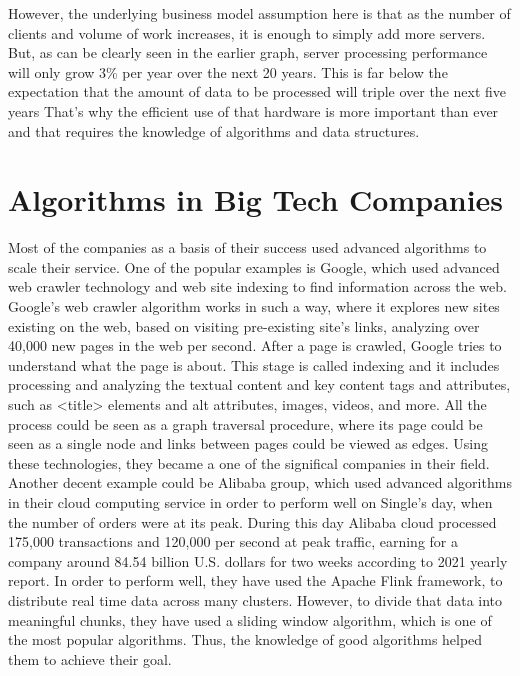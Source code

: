 However, the underlying business model assumption here is that as the number of clients and volume of work increases, it is enough to simply add more servers. But, as can be clearly seen in the earlier graph, server processing performance will only grow 3\% per year over the next 20 years. This is far below the expectation that the amount of data to be processed will triple over the next five years
That's why the efficient use of that hardware is more important than ever and that requires the knowledge of algorithms and data structures. \\

\section{Algorithms in Big Tech Companies}
Most of the companies as a basis of their success used advanced algorithms to scale their service. One of the popular examples is Google, which used advanced web crawler technology and web site indexing to find information across the web. Google’s web crawler algorithm works in such a way, where it explores new sites existing on the web, based on visiting pre-existing site’s links, analyzing over 40,000 new pages in the web per second. After a page is crawled, Google tries to understand what the page is about. This stage is called indexing and it includes processing and analyzing the textual content and key content tags and attributes, such as <title> elements and alt attributes, images, videos, and more. All the process could be seen as a graph traversal procedure, where its page could be seen as a single node and links between pages could be viewed as edges. Using these technologies, they became a one of the significal companies in their field. \\

Another decent example could be Alibaba group, which used advanced algorithms in their cloud computing service in order to perform well on Single’s day, when the number of orders were at its peak. During this day Alibaba cloud processed 175,000 transactions and 120,000 per second at peak traffic, earning for a company around 84.54 billion U.S. dollars for two weeks according to 2021 yearly report. In order to perform well, they have used the Apache Flink framework, to distribute real time data across many clusters. However, to divide that data into meaningful chunks, they have used a sliding window algorithm, which is one of the most popular algorithms. Thus, the knowledge of good algorithms helped them to achieve their goal. \\

